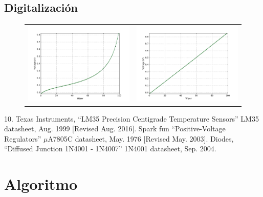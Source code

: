 \documentclass{wileysix}
\begin{document}
\section{Digitalizaci\'on}
\begin{figure}[h]
	\begin{tabular}{cc}
		\includegraphics[width=0.5\linewidth]{extras/without_follower.pdf}
		& 
		\includegraphics[width=0.5\linewidth]{extras/with_follower.pdf}
	\end{tabular}
\end{figure}



\begin{chapreferences}{10.}
	 Texas Instruments, ``LM35 Precision	Centigrade Temperature Sensors'' LM35 datasheet, Aug. 1999 [Revised Aug.
	2016].
	 Spark fun ``Positive-Voltage Regulators'' $\mu$A7805C datasheet, May. 1976 [Revised May. 2003].
	 Diodes, ``Diffused Junction 1N4001 - 1N4007'' 1N4001 datasheet, Sep. 2004.
\end{chapreferences}

\chapter{Algoritmo}

\end{document}
